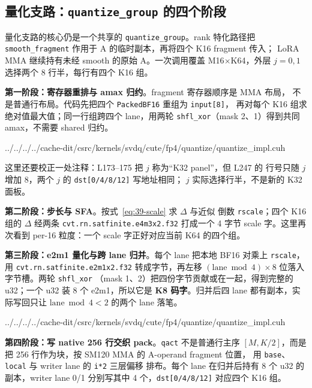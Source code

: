 \subsection{量化支路：\texttt{quantize\_group} 的四个阶段}

量化支路的核心仍是一个共享的 \texttt{quantize\_group}。rank 特化路径把
\texttt{smooth\_fragment} 作用于 A 的临时副本，再将四个 K16 fragment 传入；
LoRA MMA 继续持有未经 smooth 的原始 A。一次调用覆盖 M16$\times$K64，外层
$j=0,1$ 选择两个 8 行半，每行有四个 K16 组。

\textbf{第一阶段：寄存器重排与 amax 归约}。fragment 寄存器顺序是 MMA 布局，
不是普通行布局。代码先把四个 \texttt{PackedBF16} 重组为 \texttt{input[8]}，
再对每个 K16 组求绝对值最大值；同一行组跨四个 lane，用两轮
\texttt{shfl\_xor}（mask 2、1）得到共同 amax，不需要 shared 归约。

\begin{lstinputlisting}[linerange={185-223},firstnumber=auto,
  title={quantize\_impl.cuh L185-223（寄存器重排、amax 与四个 per-16 scale）}]{../../../../cache-dit/csrc/kernels/svdq/cute/fp4/quantize/quantize_impl.cuh}
\end{lstinputlisting}

这里还要校正一处注释：L173--175 把 $j$ 称为“K32 panel”，但 L247 的
行号只随 $j$ 增加 8，两个 $j$ 的 \texttt{dst[0/4/8/12]} 写地址相同；
$j$ 实际选择行半，不是新的 K32 面板。

\textbf{第二阶段：步长与 SFA}。按式~\ref{eq:39-scale} 求 $\Delta$ 与近似
倒数 \texttt{rscale}；四个 K16 组的 $\Delta$ 经两条
\texttt{cvt.rn.satfinite.}\allowbreak\texttt{e4m3x2.f32} 打成一个
4 字节 scale 字。这里再次看到
per-16 粒度：一个 scale 字正好对应当前 K64 的四个组。

\textbf{第三阶段：e2m1 量化与跨 lane 归并}。每个 lane 把本地 BF16 对乘上
\texttt{rscale}，用 \texttt{cvt.rn.satfinite.}\allowbreak\texttt{e2m1x2.f32}
转成字节，再左移
$(\mathrm{lane}\bmod4)\times8$ 位落入字节槽。两轮 \texttt{shfl\_xor}
（mask 1、2）把四份字节贡献或在一起，得到完整的 u32；一个 u32 装 8 个
e2m1，所以它是 \textbf{K8 码字}。归并后四 lane 都有副本，实际写回只让
$\mathrm{lane}\bmod4<2$ 的两个 lane 落笔。

\begin{lstinputlisting}[linerange={224-263},firstnumber=auto,
  title={quantize\_impl.cuh L224-263（E2M1 归并与 native pack 的 qact 写出）}]{../../../../cache-dit/csrc/kernels/svdq/cute/fp4/quantize/quantize_impl.cuh}
\end{lstinputlisting}

\textbf{第四阶段：写 native 256 行交织 pack}。\texttt{qact} 不是普通行主序
$[M,K/2]$，而是把 256 行作为块，按 SM120 MMA 的 A-operand fragment 位置，
用 \texttt{base}、\texttt{local} 与 writer lane 的 \texttt{i*2} 三层偏移
排布。每个 lane 在归并后持有 8 个 u32 的副本，writer lane 0/1 分别写其中
4 个，\texttt{dst[0/4/8/12]} 对应四个 K16 组。

